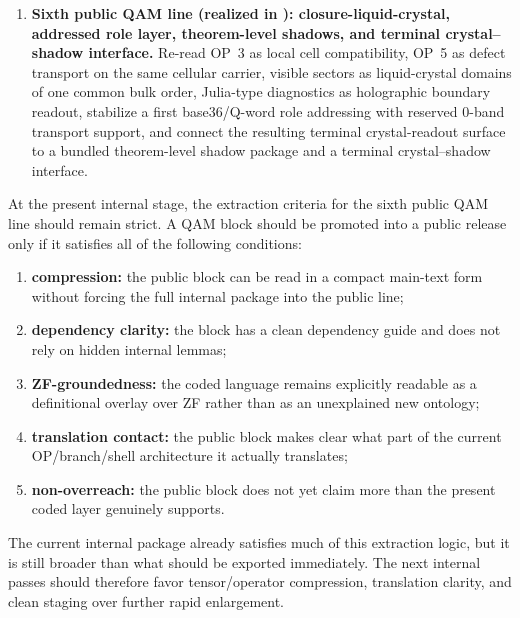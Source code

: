\begin{enumerate}[leftmargin=2em]
 \item \textbf{Sixth public QAM line (realized in ): closure-liquid-crystal, addressed role layer, theorem-level shadows, and terminal crystal--shadow interface.} Re-read OP~3 as local cell compatibility, OP~5 as defect transport on the same cellular carrier, visible sectors as liquid-crystal domains of one common bulk order, Julia-type diagnostics as holographic boundary readout, stabilize a first base36/Q-word role addressing with reserved 0-band transport support, and connect the resulting terminal crystal-readout surface to a bundled theorem-level shadow package and a terminal crystal--shadow interface.
\end{enumerate}

At the present internal stage, the extraction criteria for the sixth public QAM line should remain strict. A QAM block should be promoted into a public release only if it satisfies all of the following conditions:
\begin{enumerate}[leftmargin=2em]
 \item \textbf{compression:} the public block can be read in a compact main-text form without forcing the full internal package into the public line;
 \item \textbf{dependency clarity:} the block has a clean dependency guide and does not rely on hidden internal lemmas;
 \item \textbf{ZF-groundedness:} the coded language remains explicitly readable as a definitional overlay over ZF rather than as an unexplained new ontology;
 \item \textbf{translation contact:} the public block makes clear what part of the current OP/branch/shell architecture it actually translates;
 \item \textbf{non-overreach:} the public block does not yet claim more than the present coded layer genuinely supports.
\end{enumerate}

\begin{remark}
The current internal package already satisfies much of this extraction logic, but it is still broader than what should be exported immediately. The next internal passes should therefore favor tensor/operator compression, translation clarity, and clean staging over further rapid enlargement.
\end{remark}

